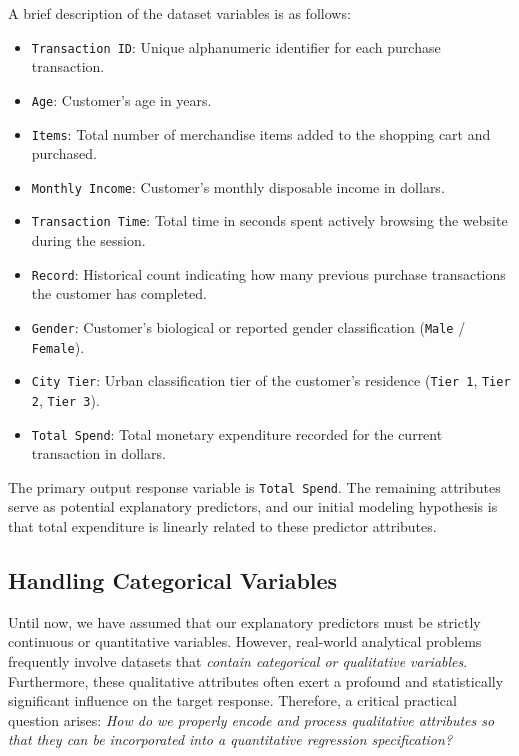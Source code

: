 A brief description of the dataset variables is as follows:
\begin{itemize}
	\item \texttt{Transaction ID}: Unique alphanumeric identifier for each purchase transaction.
	\item \texttt{Age}: Customer's age in years.
	\item \texttt{Items}: Total number of merchandise items added to the shopping cart and purchased.
	\item \texttt{Monthly Income}: Customer's monthly disposable income in dollars.
	\item \texttt{Transaction Time}: Total time in seconds spent actively browsing the website during the session.
	\item \texttt{Record}: Historical count indicating how many previous purchase transactions the customer has completed.
	\item \texttt{Gender}: Customer's biological or reported gender classification (\texttt{Male} / \texttt{Female}).
	\item \texttt{City Tier}: Urban classification tier of the customer's residence (\texttt{Tier 1}, \texttt{Tier 2}, \texttt{Tier 3}).
	\item \texttt{Total Spend}: Total monetary expenditure recorded for the current transaction in dollars.
\end{itemize}

The primary output response variable is \texttt{Total Spend}. The remaining attributes serve as potential explanatory predictors, and our initial modeling hypothesis is that total expenditure is linearly related to these predictor attributes.

\subsection{Handling Categorical Variables}

Until now, we have assumed that our explanatory predictors must be strictly continuous or quantitative variables. However, real-world analytical problems frequently involve datasets that \emph{contain categorical or qualitative variables}. Furthermore, these qualitative attributes often exert a profound and statistically significant influence on the target response. Therefore, a critical practical question arises: \emph{How do we properly encode and process qualitative attributes so that they can be incorporated into a quantitative regression specification?}


